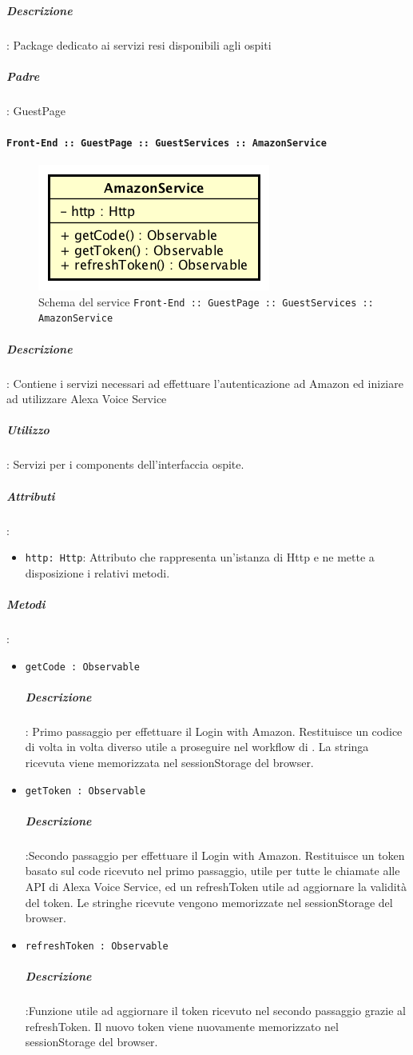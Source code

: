\documentclass[../DefinizioneDiProdotto_v3.0.0.tex]{subfiles}
\begin{document}
			\subparagraph{Descrizione}: Package dedicato ai servizi resi disponibili agli ospiti
			\subparagraph{Padre}: GuestPage

			\paragraph{\texttt{Front-End :: GuestPage :: GuestServices :: AmazonService}}
			\acapo
			\begin{figure}[!h]
				\centering
				\includegraphics[scale=0.7]{Architettura/Front-End/GuestPage/GuestServices/AmazonService.png}
				\caption{Schema del service \texttt{Front-End :: GuestPage :: GuestServices :: AmazonService}}
			\end{figure}

			\subparagraph{Descrizione}: Contiene i servizi necessari ad effettuare l'autenticazione ad Amazon ed iniziare ad utilizzare Alexa Voice Service
			\subparagraph{Utilizzo}: Servizi per i components dell'interfaccia ospite.
			\subparagraph{Attributi}:
			\begin{itemize}
				\item \texttt{http: Http}: Attributo che rappresenta un'istanza di Http e ne mette a disposizione i relativi metodi.
			\end{itemize}
			\subparagraph{Metodi}:
			\begin{itemize}
				\item \texttt{getCode : Observable}
				\subparagraph{Descrizione}: Primo passaggio per effettuare il Login with Amazon. Restituisce un codice di volta in volta diverso utile a proseguire nel workflow di . La stringa ricevuta viene memorizzata nel sessionStorage del browser.

				\item \texttt{getToken : Observable}
				\subparagraph{Descrizione}:Secondo passaggio per effettuare il Login with Amazon. Restituisce un token basato sul code ricevuto nel primo passaggio, utile per tutte le chiamate alle API di Alexa Voice Service, ed un refreshToken utile ad aggiornare la validità del token. Le stringhe ricevute vengono memorizzate nel sessionStorage del browser.

				\item \texttt{refreshToken : Observable}
				\subparagraph{Descrizione}:Funzione utile ad aggiornare il token ricevuto nel secondo passaggio grazie al refreshToken. Il nuovo token viene nuovamente memorizzato nel sessionStorage del browser.
			\end{itemize}
\end{document}
